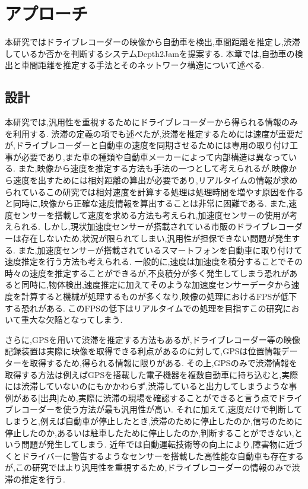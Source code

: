 
\chapter{アプローチ}
本研究ではドライブレコーダーの映像から自動車を検出,車間距離を推定し,渋滞しているか否かを判断するシステムDepth2Jamを提案する.
本章では,自動車の検出と車間距離を推定する手法とそのネットワーク構造について述べる.

\section{設計}
本研究では,汎用性を重視するためにドライブレコーダーから得られる情報のみを利用する.
渋滞の定義の項でも述べたが,渋滞を推定するためには速度が重要だが,ドライブレコーダーと自動車の速度を同期させるためには専用の取り付け工事が必要であり,また車の種類や自動車メーカーによって内部構造は異なっている.
また,映像から速度を推定する方法も手法の一つとして考えられるが,映像から速度を出すためには相対距離の算出が必要であり,リアルタイムの情報が求められているこの研究では相対速度を計算する処理は処理時間を増やす原因を作ると同時に,映像から正確な速度情報を算出することは非常に困難である.
また,速度センサーを搭載して速度を求める方法も考えられ,加速度センサーの使用が考えられる.
しかし,現状加速度センサーが搭載されている市販のドライブレコーダーは存在しないため,状況が限られてしまい,汎用性が担保できない問題が発生する.
また,加速度センサーが搭載されているスマートフォンを自動車に取り付けて速度推定を行う方法も考えられる.
一般的に,速度は加速度を積分することでその時々の速度を推定することができるが,不良積分が多く発生してしまう恐れがあると同時に,物体検出,速度推定に加えてそのような加速度センサーデータから速度を計算すると機械が処理するものが多くなり,映像の処理におけるFPSが低下する恐れがある.
このFPSの低下はリアルタイムでの処理を目指すこの研究において重大な欠陥となってしまう.

さらに,GPSを用いて渋滞を推定する方法もあるが,ドライブレコーダー等の映像記録装置は実際に映像を取得できる利点があるのに対して,GPSは位置情報データーを取得するため,得られる情報に限りがある.
その上,GPSのみで渋滞情報を取得する方法は例えばGPSを搭載した電子機器を複数自動車に持ち込むと,実際には渋滞していないのにもかかわらず,渋滞していると出力してしまうような事例がある[出典]ため,実際に渋滞の現場を確認することができると言う点でドライブレコーダーを使う方法が最も汎用性が高い.
それに加えて,速度だけで判断してしまうと,例えば自動車が停止したとき,渋滞のために停止したのか,信号のために停止したのか,あるいは駐車したために停止したのか,判断することができない,という問題が発生してしまう.
近年では自動運転技術等の向上により,障害物に近づくとドライバーに警告するようなセンサーを搭載した高性能な自動車も存在するが,この研究ではより汎用性を重視するため,ドライブレコーダーの情報のみで渋滞の推定を行う.

